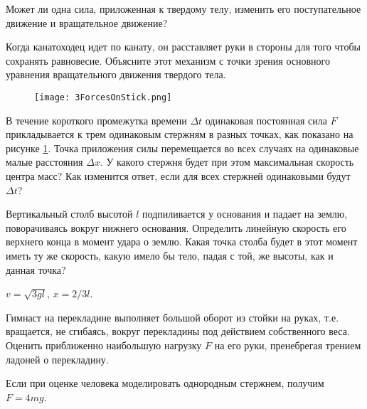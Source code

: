 \qualProblems

\begin{ex}
Может ли одна сила, приложенная к твердому телу, изменить его поступательное движение и вращательное движение?
\end{ex}	

\begin{ex}
Когда канатоходец идет по канату, он расставляет руки в стороны для того чтобы сохранять равновесие. Объясните этот механизм с точки зрения основного уравнения вращательного движения твердого тела.
\end{ex}	

\begin{figure}[h]
\centering
\texttt{[image: 3ForcesOnStick.png]}
\caption{}
\label{3ForcesOnStick}
\end{figure}

\begin{ex}
В течение короткого промежутка времени $\Delta t$ одинаковая постоянная сила $F$ прикладывается к трем одинаковым стержням в разных точках, как показано на рисунке \ref{3ForcesOnStick}. Точка приложения силы перемещается во всех случаях на одинаковые малые расстояния $\Delta x$. У какого стержня будет при этом максимальная скорость центра масс? Как изменится ответ, если для всех стержней одинаковыми будут $\Delta t$?
\end{ex}	

\simpleProblems

\begin{ex} %
Вертикальный столб высотой $l$ подпиливается у основания и падает на землю, поворачиваясь вокруг нижнего основания. Определить линейную скорость его верхнего конца в момент удара о землю. Какая точка столба будет в этот момент иметь ту же скорость, какую имело бы тело, падая с той, же высоты, как и данная точка?
\begin{ans}
$v = \sqrt{3gl}$, $x = 2/3l$.
\end{ans}
\end{ex}	

\begin{ex} %
Гимнаст на перекладине выполняет большой оборот из стойки на руках, т.е. вращается, не сгибаясь, вокруг перекладины под действием собственного веса. Оценить приближенно наибольшую нагрузку $F$ на его руки, пренебрегая трением ладоней о перекладину.
\begin{ans}
Если при оценке человека моделировать однородным стержнем, получим $F = 4mg$.
\end{ans}
\end{ex}	

